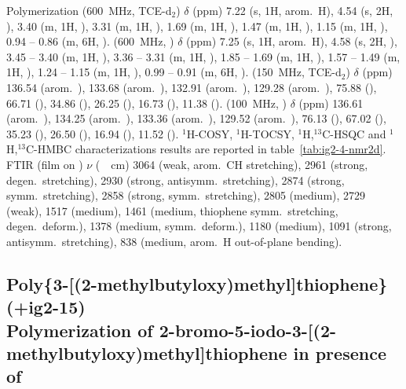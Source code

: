 \begin{section}{Polymerization}
{\HNMR} (\SI{600}{\MHz}, \gls{TCE}-d$_2$) $\delta$ (ppm) 7.22 (s, 1H, arom.\ H), 4.54 (s, 2H, ), 3.40 (m, 1H, ), 3.31 (m, 1H, ), 1.69 (m, 1H, ), 1.47 (m, 1H, ), 1.15 (m, 1H, ), 0.94 -- 0.86 (m, 6H, ).
{\HNMR} (\SI{600}{\MHz}, ) $\delta$ (ppm) 7.25 (s, 1H, arom.\ H), 4.58 (s, 2H, ), 3.45 -- 3.40 (m, 1H, ), 3.36 -- 3.31 (m, 1H, ), 1.85 -- 1.69 (m, 1H, ), 1.57 -- 1.49 (m, 1H, ), 1.24 -- 1.15 (m, 1H, ), 0.99 -- 0.91 (m, 6H, ).
{\CNMR} (\SI{150}{\MHz}, \gls{TCE}-d$_2$) $\delta$ (ppm) 136.54 (arom.\ ), 133.68 (arom.\ ), 132.91 (arom.\ ), 129.28 (arom.\ ), 75.88 (), 66.71 (), 34.86 (), 26.25 (), 16.73 (), 11.38 ().
{\CNMR} (\SI{100}{\MHz}, ) $\delta$ (ppm) 136.61 (arom.\ ), 134.25 (arom.\ ), 133.36 (arom.\ ), 129.52 (arom.\ ), 76.13 (), 67.02 (), 35.23 (), 26.50 (), 16.94 (), 11.52 ().
$^1$H-COSY, $^1$H-TOCSY, $^1$H,$^{13}$C-HSQC and $^1$H,$^{13}$C-HMBC characterizations results are reported in table~\ref{tab:ig2-4-nmr2d}.
\gls{FTIR} (film on ) $\nu$ (\SI{}{\per\cm}) 3064 (weak, arom.\ CH stretching), 2961 (strong,  degen.\ stretching), 2930 (strong,  antisymm.\ stretching), 2874 (strong,  symm.\ stretching), 2858 (strong,  symm.\ stretching), 2805 (medium), 2729 (weak), 1517 (medium), 1461 (medium,  thiophene symm.\ stretching,  degen.\ deform.), 1378 (medium,  symm.\ deform.), 1180 (medium), 1091 (strong,  antisymm.\ stretching), 838 (medium, arom.\ H out-of-plane bending).

\vfill

\subsection[Poly\{3-[(2-methyl\-butyl\-oxy)\-methyl{]}\-thio\-phene\} (\cmpd+{ig2-15})]{Poly\{3-[(2-methyl\-butyl\-oxy)\-methyl{]}\-thio\-phene\} (\cmpd+{ig2-15}) \\ Polymerization of 2-bromo-5-iodo-3-[(2-methyl\-butyl\-oxy)\-methyl{]}\-thio\-phene in presence of }
\label{sec:ig2-15}


\end{section}
